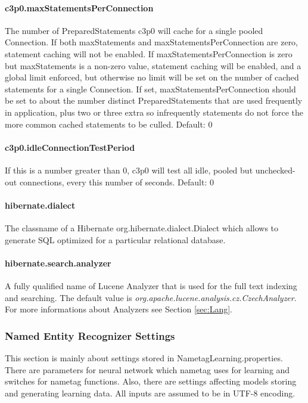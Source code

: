 \paragraph{c3p0.maxStatementsPerConnection}
The number of PreparedStatements c3p0 will ca\-che for a single pooled Connection.
If both maxStatements and maxStatementsPerConnection are zero, statement caching
will not be enabled. If maxStatementsPerConnection is zero but maxStatements is
a non-zero value, statement caching will be enabled, and a global limit enforced,
but otherwise no limit will be set on the number of cached statements for a single
Connection. If set, maxStatementsPerConnection should be set to about the number
distinct PreparedStatements that are used frequently in application, plus
two or three extra so infrequently statements do not force the more common cached
statements to be culled.
Default: 0

\paragraph{c3p0.idleConnectionTestPeriod}
If this is a number greater than 0, c3p0 will test all idle, pooled but unchecked-out
connections, every this number of seconds.
Default: 0

\paragraph{hibernate.dialect}
The classname of a Hibernate org.hibernate.dialect.Dialect which allows to generate
SQL optimized for a particular relational database.

\paragraph{hibernate.search.analyzer}
A fully qualified name of Lucene Analyzer that is used for the full text indexing
and searching. The default value is \emph{org.\-apache.\-lucene.\-analysis.\-cz.\-CzechAnalyzer}.
For more informations about Analyzers see Section \ref{sec:Lang}.

\subsubsection{Named Entity Recognizer Settings}
\label{sssec:NametagSettings}
This section is mainly about settings stored in NametagLearning.properties. There
are parameters for neural network which nametag uses for learning and switches for
nametag functions. Also, there are settings affecting models storing and
generating learning data. All inputs are assumed to be in UTF-8 encoding.

